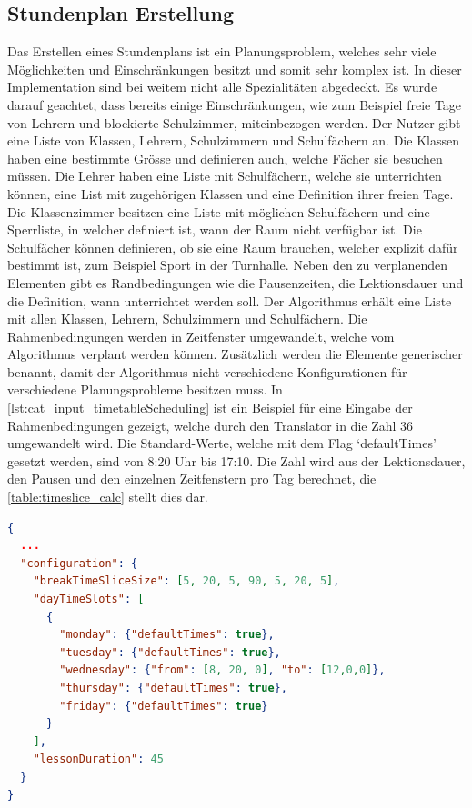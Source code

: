\subsection{Stundenplan Erstellung}
Das Erstellen eines Stundenplans ist ein Planungsproblem, welches sehr viele Möglichkeiten und Einschränkungen besitzt und somit sehr komplex ist. In dieser Implementation sind bei weitem 
nicht alle Spezialitäten abgedeckt. Es wurde darauf geachtet, dass bereits einige Einschränkungen, wie zum Beispiel freie Tage von Lehrern und blockierte Schulzimmer, miteinbezogen werden. 
Der Nutzer gibt eine Liste von Klassen, Lehrern, Schulzimmern und Schulfächern an. Die Klassen haben eine bestimmte Grösse und definieren auch, welche Fächer sie besuchen müssen. Die 
Lehrer haben eine Liste mit Schulfächern, welche sie unterrichten können, eine List mit zugehörigen Klassen und eine Definition ihrer freien Tage. Die Klassenzimmer besitzen eine Liste mit 
möglichen Schulfächern und eine Sperrliste, in welcher definiert ist, wann der Raum nicht verfügbar ist. Die Schulfächer können definieren, ob sie eine Raum brauchen, welcher explizit dafür 
bestimmt ist, zum Beispiel Sport in der Turnhalle. Neben den zu verplanenden Elementen gibt es Randbedingungen wie die Pausenzeiten, die Lektionsdauer und die Definition, 
wann unterrichtet werden soll. Der Algorithmus erhält eine Liste mit allen Klassen, Lehrern, Schulzimmern und Schulfächern. Die Rahmenbedingungen werden in Zeitfenster umgewandelt, 
welche vom Algorithmus verplant werden können. Zusätzlich werden die Elemente generischer benannt, damit der Algorithmus nicht verschiedene Konfigurationen für verschiedene 
Planungsprobleme besitzen muss. In \autoref{lst:cat_input_timetableScheduling} ist ein Beispiel für eine Eingabe der Rahmenbedingungen gezeigt, welche durch den Translator in die Zahl 36 
umgewandelt wird. Die Standard-Werte, welche mit dem Flag `defaultTimes' gesetzt werden, sind von 8:20 Uhr bis 17:10. Die Zahl wird aus der Lektionsdauer, den Pausen und den einzelnen 
Zeitfenstern pro Tag berechnet, die \autoref{table:timeslice_calc} stellt dies dar.

\begin{lstlisting}[language=JSON, caption=Ausschnitt einer Eingabe für das Stundenplanproblem für die Rahmenbedingungen, label=lst:cat_input_timetableScheduling]  
{
  ...
  "configuration": {
    "breakTimeSliceSize": [5, 20, 5, 90, 5, 20, 5],
    "dayTimeSlots": [
      {
        "monday": {"defaultTimes": true},
        "tuesday": {"defaultTimes": true},
        "wednesday": {"from": [8, 20, 0], "to": [12,0,0]},
        "thursday": {"defaultTimes": true},
        "friday": {"defaultTimes": true}
      }
    ],
    "lessonDuration": 45
  }
}
\end{lstlisting}

